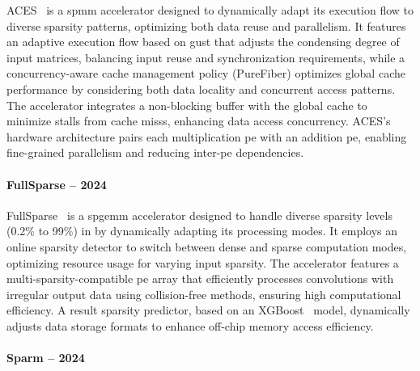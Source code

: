 ACES~\cite{Lu2024_ACES} is a \acrshort{spmm} accelerator designed to dynamically adapt its execution flow to diverse sparsity patterns, optimizing both data reuse and parallelism.
It features an adaptive execution flow based on \acrlong{gust} that adjusts the condensing degree of input matrices, balancing input reuse and synchronization requirements, while a concurrency-aware cache management policy (PureFiber) optimizes global cache performance by considering both data locality and concurrent access patterns.
The accelerator integrates a non-blocking buffer with the global cache to minimize stalls from cache \glspl{miss}, enhancing data access concurrency.
ACES's hardware architecture pairs each multiplication \acrlong{pe} with an addition \acrlong{pe}, enabling fine-grained parallelism and reducing inter-\acrshort{pe} dependencies.

\paragraph{FullSparse -- 2024}

FullSparse~\cite{Yu2024_FullSparse} is a \acrshort{spgemm} accelerator designed to handle diverse sparsity levels (0.2\% to 99\%) in  by dynamically adapting its processing modes.
It employs an online sparsity detector to switch between dense and sparse computation modes, optimizing resource usage for varying input sparsity.
The accelerator features a multi-sparsity-compatible \acrshort{pe} array that efficiently processes convolutions with irregular output data using collision-free methods, ensuring high computational efficiency.
A result sparsity predictor, based on an XGBoost~\cite{Chen2016_XGBoost} model, dynamically adjusts data storage formats to enhance off-chip memory access efficiency.

\paragraph{Sparm -- 2024}

